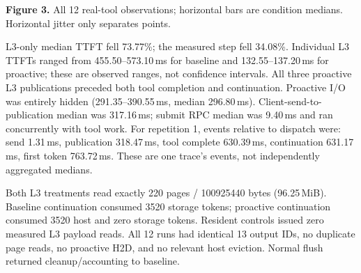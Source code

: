 \documentclass[10pt,a4paper]{article}
\begin{document}
\begin{center}
\end{center}
{\small\textbf{Figure 3.} All 12 real-tool observations; horizontal bars are condition medians. Horizontal jitter only separates points.}

L3-only median TTFT fell 73.77\%; the measured step fell 34.08\%. Individual L3 TTFTs ranged from 455.50--573.10\,ms for baseline and 132.55--137.20\,ms for proactive; these are observed ranges, not confidence intervals. All three proactive L3 publications preceded both tool completion and continuation. Proactive I/O was entirely hidden (291.35--390.55\,ms, median 296.80\,ms). Client-send-to-publication median was 317.16\,ms; submit RPC median was 9.40\,ms and ran concurrently with tool work. For repetition 1, events relative to dispatch were: send 1.31\,ms, publication 318.47\,ms, tool complete 630.39\,ms, continuation 631.17\,ms, first token 763.72\,ms. These are one trace's events, not independently aggregated medians.

Both L3 treatments read exactly 220 pages / 100925440 bytes (96.25\,MiB). Baseline continuation consumed 3520 storage tokens; proactive continuation consumed 3520 host and zero storage tokens. Resident controls issued zero measured L3 payload reads. All 12 runs had identical 13 output IDs, no duplicate page reads, no proactive H2D, and no relevant host eviction. Normal flush returned cleanup/accounting to baseline.
\end{document}
